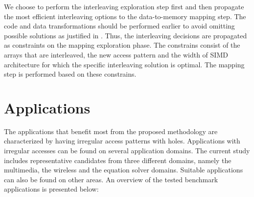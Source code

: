 We choose to perform the interleaving exploration step first and then propagate the most efficient interleaving options to the data-to-memory mapping step.
The code and data transformations should be performed earlier to avoid omitting possible solutions as justified in \cite{dtse}.
Thus, the interleaving decisions are propagated as constraints on the mapping exploration phase. 
The constrains consist of the arrays that are interleaved, the new access pattern and the width of SIMD architecture for which the specific interleaving solution is optimal.
The mapping step is performed based on these constrains.

\section{Applications}
\label{sec:applicationsD}

The applications that benefit most from the proposed methodology are characterized by having irregular access patterns with holes.
Applications with irregular accesses can be found on several application domains.
The current study includes representative candidates from three different domains, namely the multimedia, the wireless and the equation solver domains.
Suitable applications can also be found on other areas.
An overview of the tested benchmark applications is presented below:

